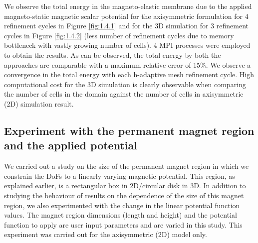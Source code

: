 We observe the total energy in the magneto-elastic membrane due to the applied magneto-static magnetic scalar potential for the axisymmetric formulation for 4 refinement cycles in Figure \eqref{fig:1.4.1} and for the 3D simulation for 3 refinement cycles in Figure \eqref{fig:1.4.2} (less number of refinement cycles due to memory bottleneck with vastly growing number of cells). 4 MPI processes were employed to obtain the results. As can be observed, the total energy by both the approaches are comparable with a maximum relative error of 15\%. We observe a convergence in the total energy with each h-adaptive mesh refinement cycle. High computational cost for the 3D simulation is clearly observable when comparing the number of cells in the domain against the number of cells in axisymmetric (2D) simulation result. \par 

\subsection{Experiment with the permanent magnet region and the applied potential}
We carried out a study on the size of the permanent magnet region in which we constrain the DoFs to a linearly varying magnetic potential. This region, as explained earlier, is a rectangular box in 2D/circular disk in 3D. In addition to studying the behaviour of results on the dependence of the size of this magnet region, we also experimented with the change in the linear potential function values. The magnet region dimensions (length and height) and the potential function to apply are user input parameters and are varied in this study. This experiment was carried out for the axisymmetric (2D) model only.\par 

